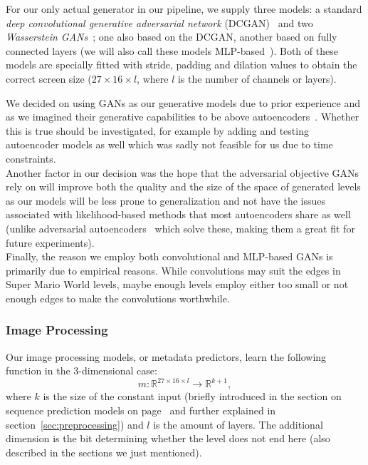 For our only actual generator in our pipeline, we supply three models:
a standard \emph{deep convolutional generative adversarial network}
(DCGAN)~\cite{radfordUnsupervisedRepresentationLearning2016} and two
\emph{Wasserstein
  GANs}~\cite{arjovskyWassersteinGAN2017,martinarjovskyMartinarjovskyWassersteinGAN2019};
one also based on the DCGAN, another based on fully connected layers
(we will also call these models
MLP-based~\cite{MultilayerPerceptron2019}). Both of these models are
specially fitted with stride, padding and dilation values to obtain
the correct screen size ($27 \times 16 \times l$, where $l$ is the number of
channels or layers).

We decided on using GANs as our generative models due to prior
experience and as we imagined their generative capabilities to be
above
autoencoders~\cite{kramerNonlinearPrincipalComponent1991,kingmaAutoEncodingVariationalBayes2014,Autoencoder2019}.
Whether this is true should be investigated, for example by adding and
testing autoencoder models as well which was sadly not feasible for us
due to time constraints. \\
Another factor in our decision was the hope that the adversarial
objective GANs rely on will improve both the quality and the size of
the space of generated levels as our models will be less prone to
generalization and not have the issues associated with
likelihood-based methods that most autoencoders share as well (unlike
adversarial autoencoders~\cite{makhzaniAdversarialAutoencoders2016}
which solve these, making them a great fit for future experiments). \\
Finally, the reason we employ both convolutional and MLP-based GANs is
primarily due to empirical reasons. While convolutions may suit the
edges in Super Mario World levels, maybe enough levels employ either
too small or not enough edges to make the convolutions worthwhile.

\subsubsection{Image Processing}
\label{sec:image-processing}

Our image processing models, or metadata predictors, learn the
following function in the 3-dimensional case:
\begin{equation*}
  m: \mathbb{R}^{27 \times 16 \times l} \to \mathbb{R}^{k + 1},
\end{equation*}
where $k$ is the size of the constant input (briefly introduced in the
section on sequence prediction models on
page~\pageref{sec:sequence-prediction} and further explained in
section~\ref{sec:preprocessing}) and $l$ is the amount of layers. The
additional dimension is the bit determining whether the level does not
end here (also described in the sections we just mentioned).

